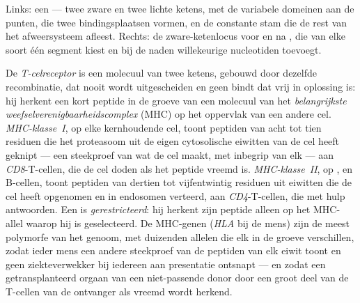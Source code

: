 \begin{omfigure}
{\small Links: een  --- twee zware en twee lichte ketens,
met de variabele domeinen aan de punten, die twee bindingsplaatsen
vormen, en de constante stam die de rest van het afweersysteem afleest.
Rechts: de zware-ketenlocus voor en na , die van elke
soort één segment kiest en bij de naden willekeurige nucleotiden
toevoegt.}
\end{omfigure}

\begin{definition}\label{def:b3:adaptive-immunity:mhc}
De \emph{T-celreceptor} is een molecuul van twee ketens, gebouwd door
dezelfde recombinatie, dat nooit wordt uitgescheiden en geen 
bindt dat vrij in oplossing is: hij herkent een kort peptide in de
groeve van een molecuul van het \emph{belangrijkste
weefselverenigbaarheidscomplex} (MHC) op het oppervlak van een andere
cel. \emph{MHC-klasse~I}, op elke kernhoudende cel, toont peptiden van
acht tot tien residuen die het proteasoom uit de eigen cytosolische
eiwitten van de cel heeft geknipt --- een steekproef van wat de cel
maakt, met inbegrip van elk  --- aan \emph{CD8}-T-cellen, die de
cel doden als het peptide vreemd is. \emph{MHC-klasse~II}, op
,  en B-cellen, toont peptiden van dertien
tot vijfentwintig residuen uit eiwitten die de cel heeft opgenomen en
in endosomen verteerd, aan \emph{CD4}-T-cellen, die met hulp
antwoorden. Een  is \emph{gerestricteerd}: hij herkent zijn
peptide alleen op het MHC-allel waarop hij is geselecteerd. De MHC-genen
(\emph{HLA} bij de mens) zijn de meest polymorfe van het genoom, met
duizenden allelen die elk in de groeve verschillen, zodat ieder mens
een andere steekproef van de peptiden van elk eiwit toont en geen
ziekteverwekker bij iedereen aan presentatie ontsnapt --- en zodat een
getransplanteerd orgaan van een niet-passende donor door een groot deel
van de T-cellen van de ontvanger als vreemd wordt herkend.
\end{definition}

